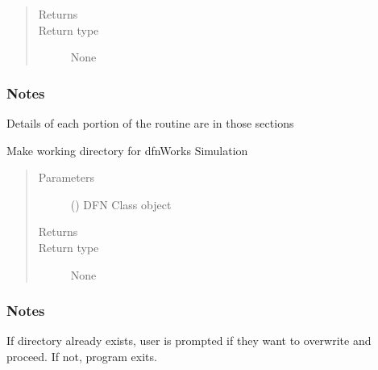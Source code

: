 \documentclass[letterpaper,10pt,english]{sphinxmanual}
\begin{document}
\begin{fulllineitems}
\begin{quote}
\begin{description}
\begin{itemize}
\end{itemize}

\item[{Returns}] \leavevmode


\item[{Return type}] \leavevmode
None

\end{description}\end{quote}
\subsubsection*{Notes}

Details of each portion of the routine are in those sections

\end{fulllineitems}


\begin{fulllineitems}
\label{\detokenize{pydfnworks:pydfnworks.dfnGen.generator.make_working_directory}}
Make working directory for dfnWorks Simulation
\begin{quote}\begin{description}
\item[{Parameters}] \leavevmode
{} () \textendash{} DFN Class object

\item[{Returns}] \leavevmode


\item[{Return type}] \leavevmode
None

\end{description}\end{quote}
\subsubsection*{Notes}

If directory already exists, user is prompted if they want to overwrite and proceed. If not, program exits.

\end{fulllineitems}
\end{document}

